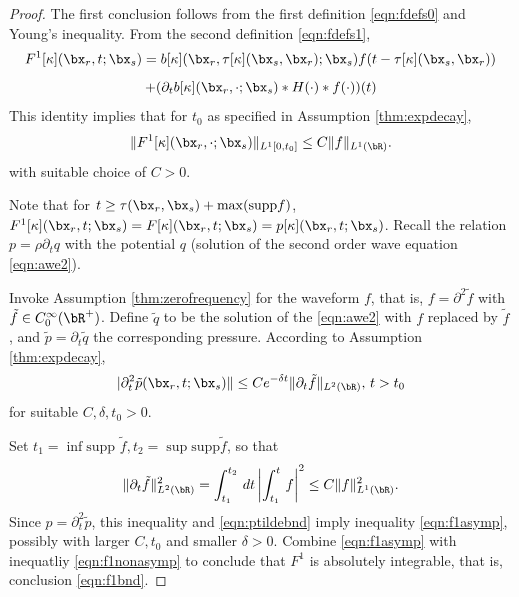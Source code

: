 \begin{proof}
The first conclusion follows from the first definition \ref{eqn:fdefs0} and
Young's inequality. 
From the second definition \ref{eqn:fdefs1},
\[
  F^1[\kappa](\bx_r,t;\bx_s) =
  b[\kappa](\bx_r,\tau[\kappa](\bx_s,\bx_r);\bx_s)
  f(t-\tau[\kappa](\bx_s,\bx_r))
\]
\begin{equation}
  \label{eqn:f1alt}
  + (\partial_t
b[\kappa](\bx_r,\cdot;\bx_s)*H(\cdot)*f(\cdot))(t)
\end{equation}
This identity implies that for $t_0$ as specified in Assumption \ref{thm:expdecay},
\begin{equation}
  \label{eqn:f1nonasymp}
  \|F^1[\kappa](\bx_r,\cdot;\bx_s)\|_{L^1[0,t_0]} \le C\|f\|_{L^1(\bR)}.
\end{equation}
with suitable choice of $C>0$.
  
Note that for $t \ge \tau(\bx_r,\bx_s) + \max({\rm supp }f)$,
$F^1[\kappa](\bx_r,t;\bx_s) = F[\kappa](\bx_r,t;\bx_s) = p[\kappa](\bx_r,t;\bx_s)$.
Recall the relation $p =
\rho \partial_t q$ with the potential $q$ (solution of the second
order wave equation \ref{eqn:awe2}).

Invoke Assumption \ref{thm:zerofrequency} for the waveform $f$, that is,
$f=\partial^2\tilde{f}$ with $\tilde{f} \in C_0^{\infty}(\bR^+)$. Define
$\tilde{q}$ to be the solution of the \ref{eqn:awe2} with $f$ replaced by
$\tilde{f}$, and $\tilde{p} = \partial_t \tilde{q}$ the corresponding
pressure. According to Assumption \ref{thm:expdecay},
\begin{equation}
  \label{eqn:ptildebnd}
  |\partial_t^2 \tilde{p}(\bx_r,t;\bx_s)\| \le C e^{-\delta t} \|\partial_t
  \tilde{f}\|_{L^2(\bR)},\,t >t_0
\end{equation}
for suitable $C, \delta, t_0> 0$.

Set $t_1=\inf \mbox{supp }\tilde{f}, t_2 = \sup  \mbox{supp
}\tilde{f}$, so that
\[
\|\partial_t \tilde{f}\|_{L^2(\bR)}^2 = \int_{t_1}^{t_2} \,dt
\left|\int_{t_1}^t\,f\right|^2 \le C\|f\|_{L^1(\bR)}^2.
\]
Since $p = \partial_t^2 \tilde{p}$, this
inequality and \ref{eqn:ptildebnd} imply inequality \ref{eqn:f1asymp},
possibly with larger $C, t_0$ and smaller $\delta > 0$. Combine
\ref{eqn:f1asymp} with 
inequatliy \ref{eqn:f1nonasymp} to conclude that $F^1$ is absolutely
integrable, that is, conclusion \ref{eqn:f1bnd}.
\end{proof}

